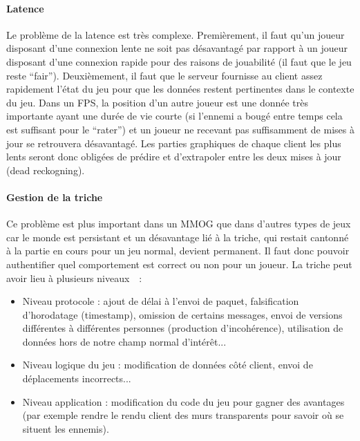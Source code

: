 \paragraph{Latence\\}
Le problème de la latence est très complexe.
Premièrement, il faut qu'un joueur disposant d'une connexion lente ne soit pas désavantagé par rapport à un joueur disposant d'une connexion rapide pour des raisons de jouabilité (il faut que le jeu reste ``fair'').
Deuxièmement, il faut que le serveur fournisse au client assez rapidement l'état du jeu pour que les données restent pertinentes dans le contexte du jeu.
Dans un FPS, la position d'un autre joueur est une donnée très importante ayant une durée de vie courte (si l'ennemi a bougé entre temps cela est suffisant pour le ``rater'') et un joueur ne recevant pas suffisamment de mises à jour se retrouvera désavantagé.
Les parties graphiques de chaque client les plus lents seront donc obligées de prédire et d'extrapoler entre les deux mises à jour (dead reckogning).

\paragraph{Gestion de la triche\\}
Ce problème est plus important dans un MMOG que dans d'autres types de jeux car le monde est persistant et un désavantage lié à la triche, qui restait cantonné à la partie en cours pour un jeu normal, devient permanent.
Il faut donc pouvoir authentifier quel comportement est correct ou non pour un joueur.
La triche peut avoir lieu à plusieurs niveaux~\cite{low_latency_and_cheat_proof_ordering_p2p}~:

\begin{itemize}
	\item Niveau protocole : ajout de délai à l'envoi de paquet, falsification d'horodatage (timestamp), omission de certains messages, envoi de versions différentes à différentes personnes (production d'incohérence), utilisation de données hors de notre champ normal d'intérêt...
	\item Niveau logique du jeu : modification de données côté client, envoi de déplacements incorrects...
	\item Niveau application : modification du code du jeu pour gagner des avantages (par exemple rendre le rendu client des murs transparents pour savoir où se situent les ennemis).
\end{itemize}

